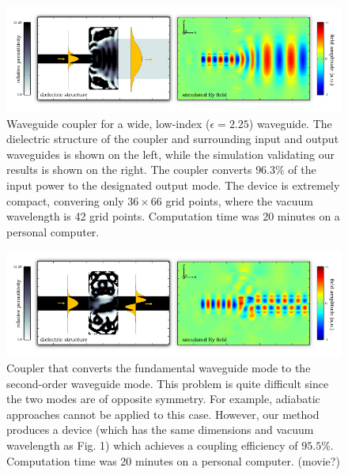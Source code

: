 \documentclass[letterpaper,10pt]{article}
\begin{document}
\begin{figure}[h]
    \centering
    \includegraphics[width=\textwidth]{quickfig/fiber} 
    \caption{Waveguide coupler for a wide, low-index 
        ($\epsilon=2.25$) waveguide. 
        The dielectric structure of the coupler and surrounding input and
        output waveguides is shown on the left, while the simulation
        validating our results is shown on the right.
        The coupler converts $96.3\%$ of the input power to the
        designated output mode.
        The device is extremely compact, 
        convering only $36 \times 66$ grid points,
        where the vacuum wavelength is 42 grid points.
        Computation time was 20 minutes on a personal computer.}
    \label{fig:fiber}
\end{figure}
\begin{figure}[h]
    \centering
    \includegraphics[width=\textwidth]{quickfig/mode-conv} 
    \caption{Coupler that converts the fundamental waveguide mode to the
        second-order waveguide mode.
        This problem is quite difficult since the two modes are of 
        opposite symmetry.
        For example, adiabatic approaches cannot be applied to this case.
        However, our method produces a device 
        (which has the same dimensions and vacuum wavelength as Fig. 1) 
        which achieves a coupling efficiency of $95.5\%$. 
        Computation time was 20 minutes on a personal computer. (movie?)
        }
    \label{fig:mode}
    \end{figure}
\end{document}
